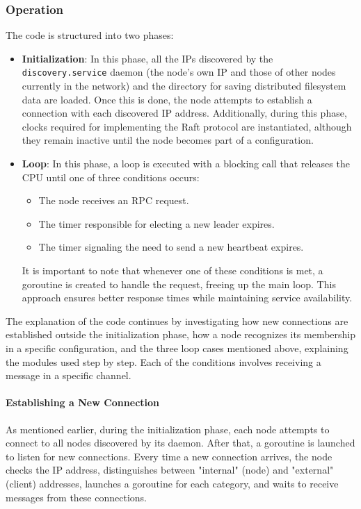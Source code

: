 \subsubsection{Operation}
The code is structured into two phases:
\begin{itemize}
  \item \textbf{Initialization}: In this phase, all the IPs discovered by the \texttt{discovery.service}
    daemon (the node's own IP and those of other nodes currently in the network) and the 
    directory for saving distributed filesystem data are loaded. Once this is done, the node 
    attempts to establish a connection with each discovered IP address. Additionally, during 
    this phase, clocks required for implementing the Raft protocol are instantiated, although 
    they remain inactive until the node becomes part of a configuration.
  \item \textbf{Loop}: In this phase, a loop is executed with a blocking call that releases the 
    CPU until one of three conditions occurs:
    \begin{itemize}
      \item The node receives an RPC request.
      \item The timer responsible for electing a new leader expires.
      \item The timer signaling the need to send a new heartbeat expires.
    \end{itemize}   
    It is important to note that whenever one of these conditions is met, a goroutine is 
    created to handle the request, freeing up the main loop. This approach ensures better 
    response times while maintaining service availability.
\end{itemize}
The explanation of the code continues by investigating how new connections are established 
outside the initialization phase, how a node recognizes its membership in a specific configuration, 
and the three loop cases mentioned above, explaining the modules used step by step. Each 
of the conditions involves receiving a message in a specific channel.

\paragraph{Establishing a New Connection}
As mentioned earlier, during the initialization phase, each node attempts to connect to all 
nodes discovered by its daemon.
After that, a goroutine is launched to listen for new connections. Every time a new connection 
arrives, the node checks the IP address, distinguishes between "internal" (node) and "external"
(client) addresses, launches a goroutine for each category, and waits to receive messages 
from these connections.

